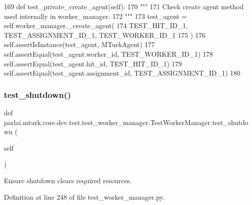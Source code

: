 \begin{DoxyCode}
169     \textcolor{keyword}{def }test\_private\_create\_agent(self):
170         \textcolor{stringliteral}{"""}
171 \textcolor{stringliteral}{        Check create agent method used internally in worker\_manager.}
172 \textcolor{stringliteral}{        """}
173         test\_agent = self.worker\_manager.\_create\_agent(
174             TEST\_HIT\_ID\_1, TEST\_ASSIGNMENT\_ID\_1, TEST\_WORKER\_ID\_1
175         )
176         self.assertIsInstance(test\_agent, MTurkAgent)
177         self.assertEqual(test\_agent.worker\_id, TEST\_WORKER\_ID\_1)
178         self.assertEqual(test\_agent.hit\_id, TEST\_HIT\_ID\_1)
179         self.assertEqual(test\_agent.assignment\_id, TEST\_ASSIGNMENT\_ID\_1)
180 
\end{DoxyCode}
\mbox{\label{classparlai_1_1mturk_1_1core_1_1dev_1_1test_1_1test__worker__manager_1_1TestWorkerManager_af0963d2895bad044ea842fb62d9a60dd}} 
\subsubsection{\texorpdfstring{test\+\_\+shutdown()}{test\_shutdown()}}
{\footnotesize\ttfamily def parlai.\+mturk.\+core.\+dev.\+test.\+test\+\_\+worker\+\_\+manager.\+Test\+Worker\+Manager.\+test\+\_\+shutdown (\begin{DoxyParamCaption}\item[{}]{self }\end{DoxyParamCaption})}

\begin{DoxyVerb}Ensure shutdown clears required resources.
\end{DoxyVerb}
 

Definition at line 248 of file test\+\_\+worker\+\_\+manager.\+py.


